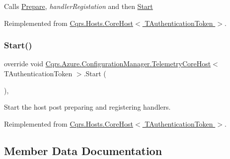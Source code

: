 Calls \hyperlink{classCqrs_1_1Azure_1_1ConfigurationManager_1_1TelemetryCoreHost_a620cb9c1ceb78a8f23b45ae749199fd4_a620cb9c1ceb78a8f23b45ae749199fd4}{Prepare}, {\itshape handler\+Registation}  and then \hyperlink{classCqrs_1_1Azure_1_1ConfigurationManager_1_1TelemetryCoreHost_a37c8e3f829743d6be1108b3fd8a5a3e7_a37c8e3f829743d6be1108b3fd8a5a3e7}{Start} 



Reimplemented from \hyperlink{classCqrs_1_1Hosts_1_1CoreHost_a118553f5aa11e7fe07fce1d899528fa6_a118553f5aa11e7fe07fce1d899528fa6}{Cqrs.\+Hosts.\+Core\+Host$<$ T\+Authentication\+Token $>$}.

\mbox{\label{classCqrs_1_1Azure_1_1ConfigurationManager_1_1TelemetryCoreHost_a37c8e3f829743d6be1108b3fd8a5a3e7_a37c8e3f829743d6be1108b3fd8a5a3e7}} 
\subsubsection{\texorpdfstring{Start()}{Start()}}
{\footnotesize\ttfamily override void \hyperlink{classCqrs_1_1Azure_1_1ConfigurationManager_1_1TelemetryCoreHost}{Cqrs.\+Azure.\+Configuration\+Manager.\+Telemetry\+Core\+Host}$<$ T\+Authentication\+Token $>$.Start (\begin{DoxyParamCaption}{ }\end{DoxyParamCaption})\hspace{0.3cm}{\ttfamily [protected]}, {\ttfamily [virtual]}}



Start the host post preparing and registering handlers. 



Reimplemented from \hyperlink{classCqrs_1_1Hosts_1_1CoreHost_ad8abd7b3c7f6970e106ba42c2745beda_ad8abd7b3c7f6970e106ba42c2745beda}{Cqrs.\+Hosts.\+Core\+Host$<$ T\+Authentication\+Token $>$}.



\subsection{Member Data Documentation}
\mbox{\label{classCqrs_1_1Azure_1_1ConfigurationManager_1_1TelemetryCoreHost_a17dab2f4d92bff926b54f9d58238de6b_a17dab2f4d92bff926b54f9d58238de6b}} 

